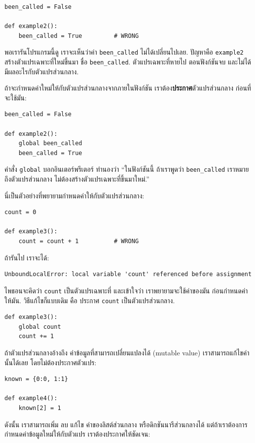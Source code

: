 \begin{verbatim}
been_called = False

def example2():
    been_called = True         # WRONG
\end{verbatim}
%
พอเรารันโปรแกรมนี้ดู เราจะเห็นว่าค่า \verb"been_called"
ไม่ได้เปลี่ยนไปเลย.  
ปัญหาคือ \texttt{example2} สร้างตัวแปรเฉพาะที่ใหม่ขึ้นมา ชื่อ \verb"been_called".  
ตัวแปรเฉพาะที่หายไป ตอนฟังก์ชันจบ
และไม่ได้มีผลอะไรกับตัวแปรส่วนกลาง.

ถ้าจะกำหนดค่าใหม่ให้กับตัวแปรส่วนกลางจากภายในฟังก์ชัน
เราต้อง\textbf{ประกาศ}ตัวแปรส่วนกลาง ก่อนที่จะใช้มัน:

\begin{verbatim}
been_called = False

def example2():
    global been_called 
    been_called = True
\end{verbatim}
%
คำสั่ง \texttt{global} บอกอินเตอร์พรีเตอร์ ทำนองว่า
``ในฟังก์ชันนี้ ถ้าเราพูดว่า \verb"been_called"
เราหมายถึงตัวแปรส่วนกลาง ไม่ต้องสร้างตัวแปรเฉพาะที่ขึ้นมาใหม่.''

นี่เป็นตัวอย่างที่พยายามกำหนดค่าให้กับตัวแปรส่วนกลาง:

\begin{verbatim}
count = 0

def example3():
    count = count + 1          # WRONG
\end{verbatim}
%
ถ้ารันไป เราจะได้:

\begin{verbatim}
UnboundLocalError: local variable 'count' referenced before assignment
\end{verbatim}
%
ไพธอนจะคิดว่า \texttt{count} เป็นตัวแปรเฉพาะที่
และเข้าใจว่า เราพยายามจะใช้ค่าของมัน ก่อนกำหนดค่าให้มัน.
วิธีแก้ไขก็แบบเดิม คือ ประกาศ \texttt{count} เป็นตัวแปรส่วนกลาง.

\begin{verbatim}
def example3():
    global count
    count += 1
\end{verbatim}
%
ถ้าตัวแปรส่วนกลางอ้างถึง ค่าข้อมูลที่สามารถเปลี่ยนแปลงได้ (mutable value)
เราสามารถแก้ไขค่านั้นได้เลย โดยไม่ต้องประกาศตัวแปร:

\begin{verbatim}
known = {0:0, 1:1}

def example4():
    known[2] = 1
\end{verbatim}
%
ดังนั้น เราสามารถเพิ่ม ลบ แก้ไข ค่าของลิสต์ส่วนกลาง หรือดิกชันนารีส่วนกลางได้
แต่ถ้าเราต้องการกำหนดค่าข้อมูลใหม่ให้กับตัวแปร เราต้องประกาศให้ชัดเจน:

